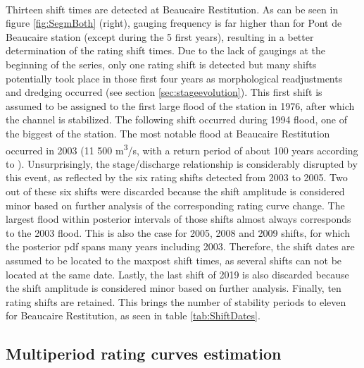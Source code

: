 \documentclass[11pt]{article}
\begin{document}
    \paragraph{}    
    Thirteen shift times are detected at Beaucaire Restitution. As can be seen in figure \ref{fig:SegmBoth} (right), gauging frequency is far higher than for Pont de Beaucaire station (except during the 5 first years), resulting in a better determination of the rating shift times. 
    Due to the lack of gaugings at the beginning of the series, only one rating shift is detected but many shifts potentially took place in those first four years as morphological readjustments and dredging occurred (see section \ref{sec:stageevolution}). This first shift is assumed to be assigned to the first large flood of the station in 1976, after which the channel is stabilized. The following shift occurred during 1994 flood, one of the biggest of the station. The most notable flood at Beaucaire Restitution occurred in 2003 (11 500 m\textsuperscript{3}/s, with a return period of about 100 years according to \citet{medd_debit_2005}). Unsurprisingly, the stage/discharge relationship is considerably disrupted by this event, as reflected by the six rating shifts detected from 2003 to 2005. Two out of these six shifts were discarded because the shift amplitude is considered minor based on further analysis of the corresponding rating curve change. The largest flood within posterior intervals of those shifts almost always corresponds to the 2003 flood. This is also the case for 2005, 2008 and 2009 shifts, for which the posterior pdf spans many years including 2003. Therefore, the shift dates are assumed to be located to the maxpost shift times, as several shifts can not be located at the same date. Lastly, the last shift of 2019 is also discarded because the shift amplitude is considered minor based on further analysis. Finally, ten rating shifts are retained. This brings the number of stability periods to eleven for Beaucaire Restitution, as seen in table \ref{tab:ShiftDates}. 
        
    \subsection{Multiperiod rating curves estimation}
\end{document}
